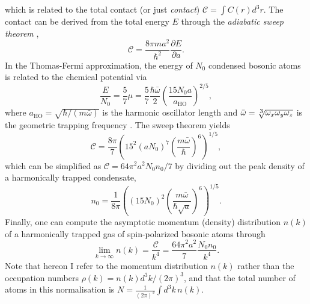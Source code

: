 	which is related to the total contact (or just \emph{contact})  $\mathcal{C} = \int C(r) d^3 r$.
	The contact can be derived from the total energy $E$ through the \emph{adiabatic sweep theorem} \cite{Tan08_energetics},
	\begin{equation}
		\mathcal{C} = \frac{8\pi m a^2}{\hbar^2}\frac{\partial E}{\partial a}.
		\label{eqn:sweep_theorem}
	\end{equation}
	In the Thomas-Fermi approximation, the energy of $N_0$ condensed bosonic atoms is related to the chemical potential via
	\begin{equation}
		\frac{E}{N_0} = \frac{5}{7}\mu = \frac{5}{7} \frac{\hbar \bar{\omega}}{2} \left(\frac{15 N_0 a}{a_\textrm{HO}}\right)^{2/5},
		\label{mu}
	\end{equation}
	where $a_\textrm{HO} = \sqrt{\hbar/(m \bar{\omega})}$ is the harmonic oscillator length and $\bar{\omega}=\sqrt[\uproot{2}\scriptstyle 3]{\omega_x \omega_y \omega_z}$ is the geometric trapping frequency \cite{PitaevskiiStringari,PethickSmith}. The sweep theorem yields
	\begin{equation}
		\mathcal{C} = \frac{8\pi}{7} \left(15^{2}(a N_0)^{7} \left(\frac{m \bar{\omega}}{\hbar}\right)^{6}\right)^{1/5},
		\label{eqn:TotalHarmonicContact}
	\end{equation}
	which can be simplified as $\mathcal{C} = 64\pi^2a^2 N_0 n_0/7$ by dividing out the peak density of a harmonically trapped condensate,
	\begin{equation}
		n_0 = \frac{1}{8 \pi}\left( (15N_0)^2 \left(\frac{m \bar{\omega}}{\hbar\sqrt{a}}\right)	 ^{6}\right)^{1/5}.
		\label{eqn:n0}
	\end{equation}
	Finally, one can compute the asymptotic momentum (density) distribution $n(k)$ of a harmonically trapped gas of spin-polarized bosonic atoms through
	\begin{equation}
		\lim_{k\rightarrow\infty} n(k) = {\frac{\mathcal{C}}{k^4}} = \frac{64\pi^2a^2}{7} \frac{N_0n_0}{k^4}.
		\label{eqn:pred_scaling}
	\end{equation}
	{Note that hereon I refer to the momentum distribution $n(k)$ rather than the occupation numbers $\rho(k) = n(k) d^3k/(2\pi)^3$, and that }
    {the total number of atoms in this normalisation is $N=\frac{1}{(2\pi)^3}\int d^3 k\, n(k)$.}
	

